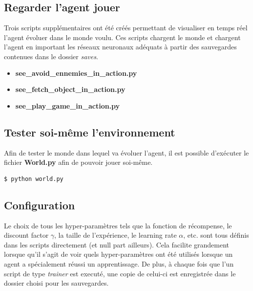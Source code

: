\documentclass[11pt,a4paper]{report}
\begin{document}
  \subsection{Regarder l'agent jouer}
  
  \par Trois scripts supplémentaires ont été créés permettant de visualiser en temps réel l'agent évoluer dans le monde voulu. Ces scripts chargent le monde et chargent l'agent en important les réseaux neuronaux adéquats à partir des sauvegardes contenues dans le dossier \textit{saves}. 

  \renewcommand{\labelitemi}{\textbullet}
  \begin{itemize}
  \item \textbf{see\_avoid\_ennemies\_in\_action.py}
  \item \textbf{see\_fetch\_object\_in\_action.py}
  \item \textbf{see\_play\_game\_in\_action.py}
  \end{itemize}
  
  \subsection{Tester soi-même l'environnement}
  
  \par Afin de tester le monde dans lequel va évoluer l'agent, il est possible d’exécuter le fichier \textbf{World.py} afin de pouvoir jouer soi-même. 
  
  \begin{lstlisting}[language=bash]
  $ python world.py
  \end{lstlisting} 
  
  \subsection{Configuration}
  
  \par Le choix de tous les hyper-paramètres tels que la fonction de récompense, le discount factor $\gamma$, la taille de l’expérience, le learning rate $\alpha$, etc. sont tous définis dans les scripts directement (et null part ailleurs). Cela facilite grandement lorsque qu'il s'agit de voir quels hyper-paramètres ont été utilisés lorsque un agent a spécialement réussi un apprentissage. De plus, à chaque fois que l'un script de type \textit{trainer} est executé, une copie de celui-ci est enregistrée dans le dossier choisi pour les sauvegardes. 
  
\end{document}
